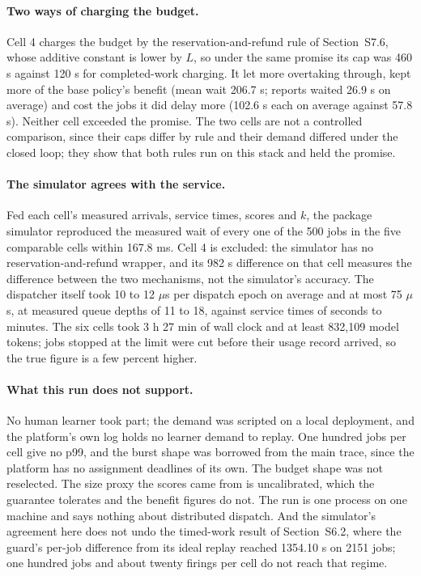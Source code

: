 \documentclass[mathematics,supfile,submit,moreauthors]{Definitions/mdpi}
\newcommand{\devnum}[1]{#1}
\begin{document}
\paragraph{Two ways of charging the budget.} Cell 4 charges the budget by the
reservation-and-refund rule of Section~S7.6, whose additive constant is lower by $L$, so under
the same promise its cap was \devnum{460} s against \devnum{120} s for completed-work
charging. It let more overtaking through, kept more of the base policy's benefit
(mean wait \devnum{206.7} s; reports waited \devnum{26.9} s on average) and cost the
jobs it did delay more (\devnum{102.6} s each on average against \devnum{57.8} s).
Neither cell exceeded the promise. The two cells are not a controlled comparison,
since their caps differ by rule and their demand differed under the closed loop; they
show that both rules run on this stack and held the promise.

\paragraph{The simulator agrees with the service.} Fed each cell's measured arrivals,
service times, scores and $k$, the package simulator reproduced the measured wait of
every one of the \devnum{500} jobs in the five comparable cells within
\devnum{167.8} ms. Cell 4 is excluded: the simulator has no reservation-and-refund
wrapper, and its \devnum{982} s difference on that cell measures the difference between
the two mechanisms, not the simulator's accuracy. The dispatcher itself took
\devnum{10} to \devnum{12} $\mu$s per dispatch epoch on average and at most
\devnum{75} $\mu$s, at measured queue depths of \devnum{11} to \devnum{18}, against
service times of seconds to minutes. The six cells took \devnum{3} h \devnum{27} min
of wall clock and at least \devnum{832{,}109} model tokens; jobs stopped at the limit
were cut before their usage record arrived, so the true figure is a few percent higher.

\paragraph{What this run does not support.} No human learner took part; the demand
was scripted on a local deployment, and the platform's own log holds no learner demand
to replay. One hundred jobs per cell give no p99, and the burst shape was borrowed from
the main trace, since the platform has no assignment deadlines of its own. The budget
shape was not reselected. The size proxy the scores came from is uncalibrated, which
the guarantee tolerates and the benefit figures do not. The run is one process on one
machine and says nothing about distributed dispatch. And the simulator's agreement here
does not undo the timed-work result of Section~S6.2, where the guard's per-job
difference from its ideal replay reached \devnum{1354.10} s on \devnum{2151} jobs; one
hundred jobs and about twenty firings per cell do not reach that regime.
\end{document}
